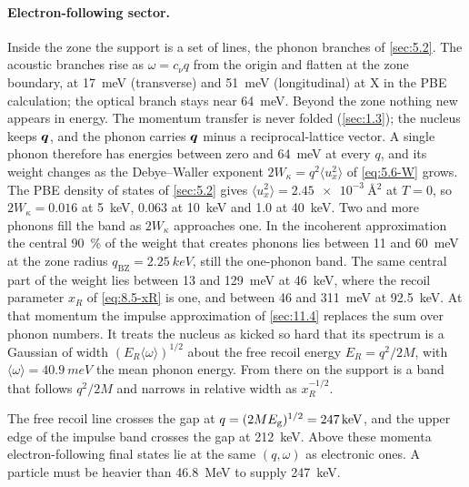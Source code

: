 \paragraph{Electron-following sector.} Inside the zone the support is a set of lines, the phonon branches of \cref{sec:5.2}. The acoustic branches rise as $\omega = c_\nu q$ from the origin and flatten at the zone boundary, at \SI{17}{meV} (transverse) and \SI{51}{meV} (longitudinal) at X in the PBE calculation; the optical branch stays near \SI{64}{meV}. Beyond the zone nothing new appears in energy. The momentum transfer is never folded (\cref{sec:1.3}); the nucleus keeps $\bm{q}$, and the phonon carries $\bm{q}$ minus a reciprocal-lattice vector. A single phonon therefore has energies between zero and \SI{64}{meV} at every $q$, and its weight changes as the Debye--Waller exponent $2W_\kappa = q^2\langle u_x^2\rangle$ of \cref{eq:5.6-W} grows. The PBE density of states of \cref{sec:5.2} gives $\langle u_x^2\rangle = \SI{2.45e-3}{\angstrom^2}$ at $T = 0$, so $2W_\kappa = 0.016$ at \SI{5}{keV}, 0.063 at \SI{10}{keV} and 1.0 at \SI{40}{keV}. Two and more phonons fill the band as $2W_\kappa$ approaches one. In the incoherent approximation the central \SI{90}{\percent} of the weight that creates phonons lies between 11 and \SI{60}{meV} at the zone radius $q_{\mathrm{BZ}} = \SI{2.25}{keV}$, still the one-phonon band. The same central part of the weight lies between 13 and \SI{129}{meV} at \SI{46}{keV}, where the recoil parameter $x_R$ of \cref{eq:8.5-xR} is one, and between 46 and \SI{311}{meV} at \SI{92.5}{keV}. At that momentum the impulse approximation of \cref{sec:11.4} replaces the sum over phonon numbers. It treats the nucleus as kicked so hard that its spectrum is a Gaussian of width $(E_R\langle\omega\rangle)^{1/2}$ about the free recoil energy $E_R = q^2/2M$, with $\langle\omega\rangle = \SI{40.9}{meV}$ the mean phonon energy. From there on the support is a band that follows $q^2/2M$ and narrows in relative width as $x_R^{-1/2}$.

The free recoil line crosses the gap at $q = (2ME_{\mathrm{g}})^{1/2} = \SI{247}{keV}$, and the upper edge of the impulse band crosses the gap at \SI{212}{keV}. Above these momenta electron-following final states lie at the same $(q,\omega)$ as electronic ones. A particle must be heavier than \SI{46.8}{MeV} to supply \SI{247}{keV}.

